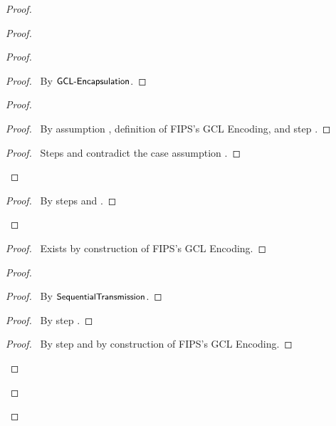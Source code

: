 \begin{proof}
\begin{proof}
\begin{proof}
            \begin{proof}
        	\pf\ By $\textsf{\small GCL-Encapsulation}$.
            \end{proof}
            \begin{proof}
        	\begin{proof}
        	    \pf\ By assumption , definition of FIPS's GCL Encoding, and step .
        	\end{proof}
        	\qedstep
        	\begin{proof}
        	    \pf\ Steps  and  contradict the case assumption .
        	\end{proof}
            \end{proof}	
            \qedstep
            \begin{proof}
        	\pf\ By steps  and .
            \end{proof}
        \end{proof}
        \begin{proof}
            \pf\ Exists by construction of FIPS's GCL Encoding.
        \end{proof}
        \begin{proof}
            \begin{proof}
        	\pf\ By $\textsf{\small SequentialTransmission}$.
            \end{proof}
            \begin{proof}
        	\pf\ By step .
            \end{proof}
            \begin{proof}
        	\pf\ By step  and by construction of FIPS's GCL Encoding.
            \end{proof}

\end{proof}
\end{proof}
\end{proof}
